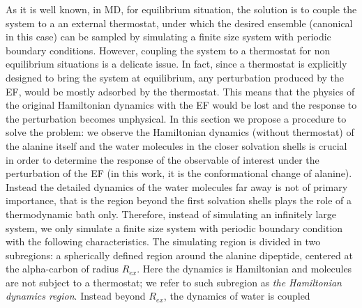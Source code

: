 \documentclass[a4paper,preprint,unsortedaddress,onecolumn]{revtex4-1}
\begin{document}
As it is well known, in MD, for equilibrium situation, the solution is to couple
the system to a an external thermostat, under which the desired ensemble
(canonical in this case) can be
sampled by simulating a finite size system with periodic boundary
conditions.
However, coupling the system to a thermostat for non equilibrium situations is a delicate issue.
In fact, since a thermostat is explicitly designed to bring the system at equilibrium, any perturbation produced by the EF, would be mostly adsorbed by the thermostat. This means that the physics of the original Hamiltonian dynamics with the EF would be lost and the response to the perturbation becomes unphysical. 
In this section we propose a procedure to solve the problem: we
observe the Hamiltonian dynamics (without thermostat) of the alanine 
itself and the water molecules in the closer solvation shells is
crucial in order to determine the response of the observable of interest
under the perturbation of the EF (in this work, it is the conformational change of alanine).
Instead the detailed dynamics of
the water molecules far away is not of primary importance, that is the region beyond the first solvation shells plays the role of a thermodynamic bath only. 
Therefore, instead of simulating an infinitely
large system, we only simulate a finite size system with periodic
boundary condition with the following characteristics. The simulating region is divided in two
subregions: a spherically defined region around the alanine dipeptide, centered at the
alpha-carbon of radius $R_{ex}$. Here the dynamics is
Hamiltonian and molecules are not subject to a thermostat; we refer to such subregion as \emph{the Hamiltonian dynamics
region}. Instead beyond $R_{ex}$, the dynamics of water is coupled
\end{document}
